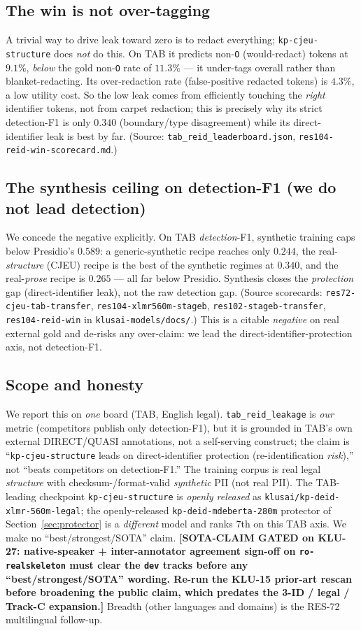 \documentclass[11pt]{article}
\newcommand{\sotagate}{\textbf{[SOTA-CLAIM GATED on KLU-27: native-speaker + inter-annotator
agreement sign-off on \texttt{ro-realskeleton} must clear the \texttt{dev} tracks before any
``best/strongest/SOTA'' wording. Re-run the KLU-15 prior-art rescan before broadening the public
claim, which predates the 3-ID / legal / Track-C expansion.]}}
\begin{document}
\subsection{The win is not over-tagging}
\label{sec:tab-not-overtagging}
A trivial way to drive leak toward zero is to redact everything; \texttt{kp-cjeu-structure} does
\emph{not} do this. On TAB it predicts non-\texttt{O} (would-redact) tokens at $9.1\%$, \emph{below}
the gold non-\texttt{O} rate of $11.3\%$ --- it under-tags overall rather than blanket-redacting.
Its over-redaction rate (false-positive redacted tokens) is $4.3\%$, a low utility cost. So the low
leak comes from efficiently touching the \emph{right} identifier tokens, not from carpet redaction;
this is precisely why its strict detection-F1 is only $0.340$ (boundary/type disagreement) while its
direct-identifier leak is best by far. (Source: \texttt{tab\_reid\_leaderboard.json},
\texttt{res104-reid-win-scorecard.md}.)

\subsection{The synthesis ceiling on detection-F1 (we do not lead detection)}
\label{sec:tab-synthesis-ceiling}
We concede the negative explicitly. On TAB \emph{detection}-F1, synthetic training caps below
Presidio's $0.589$: a generic-synthetic recipe reaches only $0.244$, the real-\emph{structure} (CJEU)
recipe is the best of the synthetic regimes at $0.340$, and the real-\emph{prose} recipe is $0.265$
--- all far below Presidio. Synthesis closes the \emph{protection} gap (direct-identifier leak), not
the raw detection gap. (Source scorecards: \texttt{res72-cjeu-tab-transfer},
\texttt{res104-xlmr560m-stageb}, \texttt{res102-stageb-transfer},
\texttt{res104-reid-win} in \texttt{klusai-models/docs/}.) This is a citable \emph{negative} on real
external gold and de-risks any over-claim: we lead the direct-identifier-protection axis, not
detection-F1.

\subsection{Scope and honesty}
\label{sec:tab-scope}
We report this on \emph{one} board (TAB, English legal). \texttt{tab\_reid\_leakage} is \emph{our}
metric (competitors publish only detection-F1), but it is grounded in TAB's own external DIRECT/QUASI
annotations, not a self-serving construct; the claim is ``\texttt{kp-cjeu-structure} leads on
direct-identifier protection (re-identification \emph{risk}),'' not ``beats competitors on
detection-F1.'' The training corpus is real legal \emph{structure} with checksum-/format-valid
\emph{synthetic} PII (not real PII). The TAB-leading checkpoint \texttt{kp-cjeu-structure} is
\emph{openly released} as \texttt{klusai/kp-deid-xlmr-560m-legal}; the openly-released
\texttt{kp-deid-mdeberta-280m} protector
of Section~\ref{sec:protector} is a \emph{different} model and ranks $7$th on this TAB axis. We make no
``best/strongest/SOTA'' claim. \sotagate{} Breadth (other languages and domains) is the RES-72
multilingual follow-up.
\end{document}
